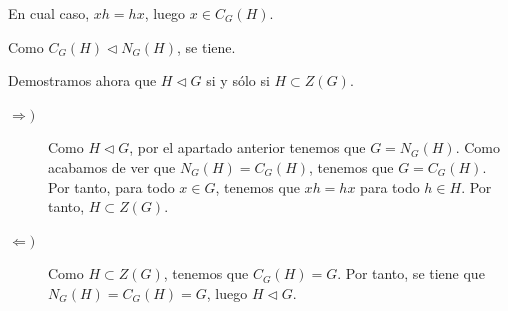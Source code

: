 \begin{ejercicio}
\begin{enumerate}
\begin{description}
            En cual caso, $xh=hx$, luego $x\in C_G(H)$.

            \item[$\supset)$] Como $C_G(H)\lhd N_G(H)$, se tiene.
        \end{description}

        Demostramos ahora que $H\lhd G$ si y sólo si $H\subset Z(G)$.
        \begin{description}
            \item[$\Longrightarrow)$] Como $H\lhd G$, por el apartado anterior tenemos que $G=N_G(H)$. Como acabamos de ver que $N_G(H)=C_G(H)$, tenemos que $G=C_G(H)$. Por tanto, para todo $x\in G$, tenemos que $xh=hx$ para todo $h\in H$. Por tanto, $H\subset Z(G)$.
            
            \item[$\Longleftarrow)$] Como $H\subset Z(G)$, tenemos que $C_G(H)=G$. Por tanto, se tiene que $N_G(H)=C_G(H)=G$, luego $H\lhd G$.
        \end{description}
    \end{enumerate}
\end{ejercicio}

